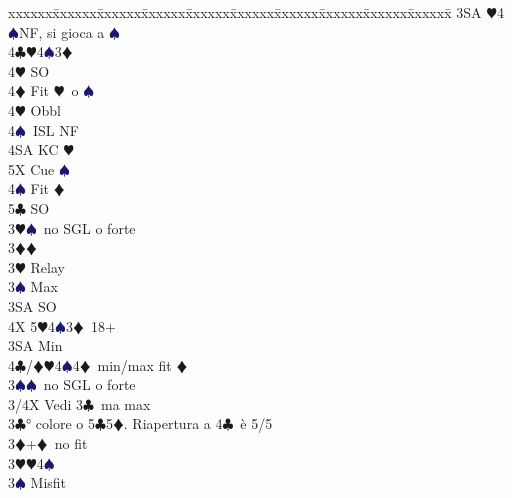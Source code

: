 \documentclass[a4paper,italian]{article}
\newcommand{\BC}{\textcolor{OliveGreen}{$\clubsuit$}}
\newcommand{\BD}{\textcolor{RedOrange}{$\vardiamondsuit$}}
\newcommand{\BH}{\textcolor{Red2}{$\varheartsuit${}}}
\newcommand{\BS}{\textcolor{MidnightBlue}{$\spadesuit${}}}
\newenvironment{bidtable}
{\begin{tabbing}

    xxxxxx\=xxxxxx\=xxxxxx\=xxxxxx\=xxxxxx\=xxxxxx\=xxxxxx\=xxxxxx\=xxxxxx\=xxxxxx\=\kill}
{\end{tabbing} }%
\begin{document}
\begin{multicols}{2}
\begin{bidtable}
                                            3SA \BH 4\BS NF, si gioca a \BS \\
                                            4\BC {}\BH 4\BS 3\BD \+\\
                                            4\BH \> SO\\
                                            4\BD \> Fit \BH\ o \BS \+\\
                                            4\BH \> Obbl\+\\
                                            4\BS\ ISL NF\\
                                            4SA KC \BH \\
                                            5X Cue \BS \-\-\\
                                            4\BS \> Fit \BD \\
                                            5\BC \> SO\-\-\\
                                            3\BH {}\BS\ no SGL o forte\-\\
                                            3\BD {}\BD \+\\
                                            3\BH \> Relay\+\\
                                            3\BS \> Max\+\\
                                            3SA \> SO\+\\
                                            4X 5\BH 4\BS 3\BD\ 18+\-\-\\
                                            3SA \> Min\\
                                            4\BC/\BD {}\BH 4\BS 4\BD\ min/max fit \BD \-\\
                                            3\BS {}\BS\ no SGL o forte\-\\
                                            3/4X \> Vedi 3\BC\ ma max\-\\
                                            3\BC {}° colore o 5\BC 5\BD . Riapertura a 4\BC\ è 5/5\\
                                            3\BD {}+\BD\ no fit\+\\
                                            3\BH {}\BH 4\BS \+\\
                                            3\BS \> Misfit\\

\end{bidtable}
\end{multicols}
\end{document}

